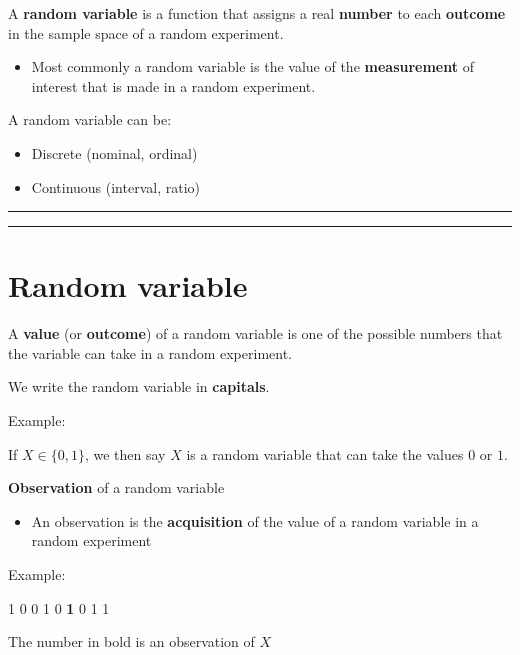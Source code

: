 \documentclass[
]{book}
\providecommand{\tightlist}{%
  \setlength{\itemsep}{0pt}\setlength{\parskip}{0pt}}
\begin{document}
A \textbf{random variable} is a function that assigns a real \textbf{number} to each \textbf{outcome} in the sample space of a random experiment.

\begin{itemize}
\tightlist
\item
  Most commonly a random variable is the value of the \textbf{measurement} of interest that is made in a random experiment.
\end{itemize}

A random variable can be:

\begin{itemize}
\tightlist
\item
  Discrete (nominal, ordinal)
\item
  Continuous (interval, ratio)
\end{itemize}

\begin{center}\rule{0.5\linewidth}{0.5pt}\end{center}

\begin{center}\rule{0.5\linewidth}{0.5pt}\end{center}

\hypertarget{random-variable-1}{%
\section{Random variable}\label{random-variable-1}}

A \textbf{value} (or \textbf{outcome}) of a random variable is one of the possible numbers that the variable can take in a random experiment.

We write the random variable in \textbf{capitals}.

Example:

If \(X \in \{0,1\}\), we then say \(X\) is a random variable that can take the values \(0\) or \(1\).

\textbf{Observation} of a random variable

\begin{itemize}
\tightlist
\item
  An observation is the \textbf{acquisition} of the value of a random variable in a random experiment
\end{itemize}

Example:

1 0 0 1 0 \textbf{1} 0 1 1

The number in bold is an observation of \(X\)
\end{document}
